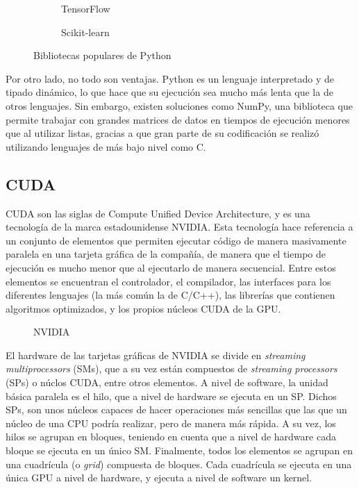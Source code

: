 			\begin{figure}[!h]
				\centering
				\begin{subfigure}{.5\textwidth}
					\centering
					
					\caption{TensorFlow}
					\label{fig:tf}
				\end{subfigure}\hfill
				\begin{subfigure}{.5\textwidth}
					\centering
					
					\caption{Scikit-learn}
					\label{fig:sklearn}
				\end{subfigure}
				\caption{Bibliotecas populares de Python}
				\label{fig:bibliotecas}
			\end{figure}
			
			Por otro lado, no todo son ventajas. Python es un lenguaje interpretado y de tipado dinámico, lo que hace que su ejecución sea mucho más lenta que la de otros lenguajes. Sin embargo, existen soluciones como NumPy, una biblioteca que permite trabajar con grandes matrices de datos en tiempos de ejecución menores que al utilizar listas, gracias a que gran parte de su codificación se realizó utilizando lenguajes de más bajo nivel como C. 
		
		\subsection{CUDA}
		
			CUDA son las siglas de Compute Unified Device Architecture, y es una tecnología de la marca estadounidense NVIDIA. Esta tecnología hace referencia a un conjunto de elementos que permiten ejecutar código de manera masivamente paralela en una tarjeta gráfica de la compañía, de manera que el tiempo de ejecución es mucho menor que al ejecutarlo de manera secuencial. Entre estos elementos se encuentran el controlador, el compilador, las interfaces para los diferentes lenguajes (la más común la de C/C++), las librerías que contienen algoritmos optimizados, y los propios núcleos CUDA de la GPU\cite{cuda}. \\
			
			\begin{figure}[!h]
				\centering
				
				\caption{NVIDIA}
				\label{fig:nvidia}
			\end{figure}
			
			El hardware de las tarjetas gráficas de NVIDIA se divide en \textit{streaming multiprocessors} (SMs), que a su vez están compuestos de \textit{streaming processors} (SPs) o núclos CUDA, entre otros elementos. A nivel de software, la unidad básica paralela es el hilo, que a nivel de hardware se ejecuta en un SP. Dichos SPs, son unos núcleos capaces de hacer operaciones más sencillas que las que un núcleo de una CPU podría realizar, pero de manera más rápida. A su vez, los hilos se agrupan en bloques, teniendo en cuenta que a nivel de hardware cada bloque se ejecuta en un único SM. Finalmente, todos los elementos se agrupan en una cuadrícula (o \textit{grid}) compuesta de bloques. Cada cuadrícula se ejecuta en una única GPU a nivel de hardware, y ejecuta a nivel de software un kernel\cite{cuda_arq,cuda_arq1}. \\
			
